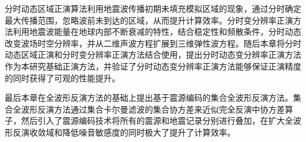 分时动态区域正演算法利用地震波传播初期未填充模拟区域的现象，通过分时确定最大传播范围，忽略波前未到达的区域，从而提升计算效率。分时变分辨率正演方法利用地震波能量在地球内部不断衰减的特性，结合稳定性和频散条件，分时动态改变波场时空分辨率，并从二维声波方程扩展到三维弹性波方程。随后本章将分时动态区域正演和分时变分辨率正演方法结合使用，提出分时动态变分辨率正演方法作为本研究基础正演方法，并验证了分时动态变分辨率正演方法能够保证正演精度的同时获得了可观的性能提升。

最后本章在全波形反演方法的基础上提出基于震源编码的集合全波形反演方法。集合全波形反演方法通过集合卡尔曼滤波的集合协方差来近似完全反演中协方差算子，然后引入了震源编码技术将所有的震源和地震记录分别进行叠加，在扩大全波形反演收敛域和降低噪音敏感度的同时极大了提升了计算效率。
